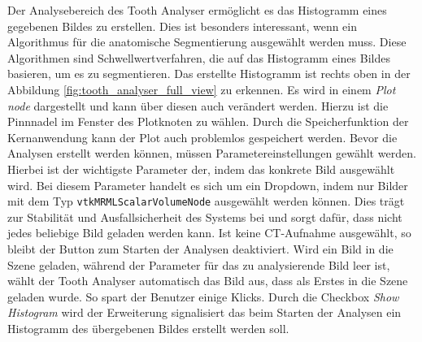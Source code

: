 Der Analysebereich des Tooth Analyser ermöglicht es das Histogramm eines gegebenen
Bildes zu erstellen. Dies ist besonders interessant, wenn ein Algorithmus für die
anatomische Segmentierung ausgewählt werden muss. Diese Algorithmen sind
Schwellwertverfahren, die auf das Histogramm eines Bildes basieren, um es zu
segmentieren. Das erstellte Histogramm ist rechts oben in der Abbildung \ref{fig:tooth_analyser_full_view}
zu erkennen. Es wird in einem \textit{Plot node} dargestellt und kann über diesen
auch verändert werden. Hierzu ist die Pinnnadel im Fenster des Plotknoten zu
wählen. Durch die Speicherfunktion der Kernanwendung kann der Plot auch problemlos
gespeichert werden. Bevor die Analysen erstellt werden können, müssen Parametereinstellungen
gewählt werden. Hierbei ist der wichtigste Parameter der, indem das konkrete Bild
ausgewählt wird. Bei diesem Parameter handelt es sich um ein Dropdown, indem nur
Bilder mit dem Typ \texttt{vtkMRMLScalarVolumeNode} ausgewählt werden können. Dies
trägt zur Stabilität und Ausfallsicherheit des Systems bei und sorgt dafür, dass
nicht jedes beliebige Bild geladen werden kann. Ist keine \ac{CT}-Aufnahme
ausgewählt, so bleibt der Button zum Starten der Analysen deaktiviert. Wird ein
Bild in die Szene geladen, während der Parameter für das zu analysierende Bild leer
ist, wählt der Tooth Analyser automatisch das Bild aus, dass als Erstes in die Szene
geladen wurde. So spart der Benutzer einige Klicks. Durch die Checkbox \textit{Show
Histogram} wird der Erweiterung signalisiert das beim Starten der Analysen ein
Histogramm des übergebenen Bildes erstellt werden soll.

